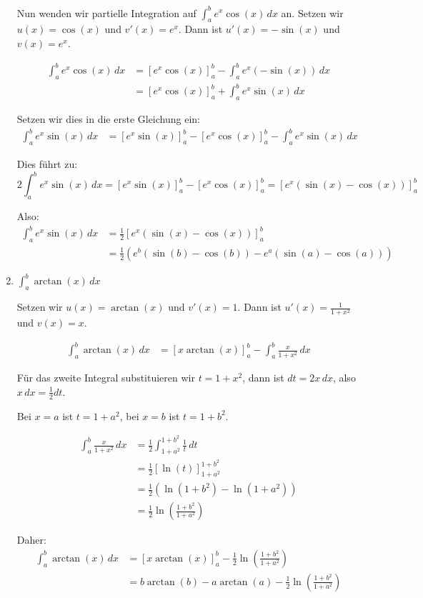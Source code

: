 \documentclass{article}
\begin{document}
\begin{enumerate}[label=(\alph*)]
Nun wenden wir partielle Integration auf $\int_a^b e^x\cos(x)\,dx$ an.
Setzen wir $u(x) = \cos(x)$ und $v'(x) = e^x$. Dann ist $u'(x) = -\sin(x)$ und $v(x) = e^x$.

\begin{align}
\int_a^b e^x\cos(x)\,dx &= [e^x\cos(x)]_a^b - \int_a^b e^x(-\sin(x))\,dx\\
&= [e^x\cos(x)]_a^b + \int_a^b e^x\sin(x)\,dx
\end{align}

Setzen wir dies in die erste Gleichung ein:
\begin{align}
\int_a^b e^x\sin(x)\,dx &= [e^x\sin(x)]_a^b - [e^x\cos(x)]_a^b - \int_a^b e^x\sin(x)\,dx
\end{align}

Dies führt zu:
$$2\int_a^b e^x\sin(x)\,dx = [e^x\sin(x)]_a^b - [e^x\cos(x)]_a^b = [e^x(\sin(x) - \cos(x))]_a^b$$

Also:
\begin{align}
\int_a^b e^x\sin(x)\,dx &= \frac{1}{2}[e^x(\sin(x) - \cos(x))]_a^b\\
&= \frac{1}{2}(e^b(\sin(b) - \cos(b)) - e^a(\sin(a) - \cos(a)))
\end{align}

\item $\int_a^b \arctan(x)\,dx$

Setzen wir $u(x) = \arctan(x)$ und $v'(x) = 1$. Dann ist $u'(x) = \frac{1}{1+x^2}$ und $v(x) = x$.

\begin{align}
\int_a^b \arctan(x)\,dx &= [x\arctan(x)]_a^b - \int_a^b \frac{x}{1+x^2}\,dx
\end{align}

Für das zweite Integral substituieren wir $t = 1 + x^2$, dann ist $dt = 2x\,dx$, also $x\,dx = \frac{1}{2}dt$.

Bei $x = a$ ist $t = 1 + a^2$, bei $x = b$ ist $t = 1 + b^2$.

\begin{align}
\int_a^b \frac{x}{1+x^2}\,dx &= \frac{1}{2}\int_{1+a^2}^{1+b^2} \frac{1}{t}\,dt\\
&= \frac{1}{2}[\ln(t)]_{1+a^2}^{1+b^2}\\
&= \frac{1}{2}(\ln(1+b^2) - \ln(1+a^2))\\
&= \frac{1}{2}\ln\left(\frac{1+b^2}{1+a^2}\right)
\end{align}

Daher:
\begin{align}
\int_a^b \arctan(x)\,dx &= [x\arctan(x)]_a^b - \frac{1}{2}\ln\left(\frac{1+b^2}{1+a^2}\right)\\
&= b\arctan(b) - a\arctan(a) - \frac{1}{2}\ln\left(\frac{1+b^2}{1+a^2}\right)
\end{align}

\end{enumerate}
\end{document}
